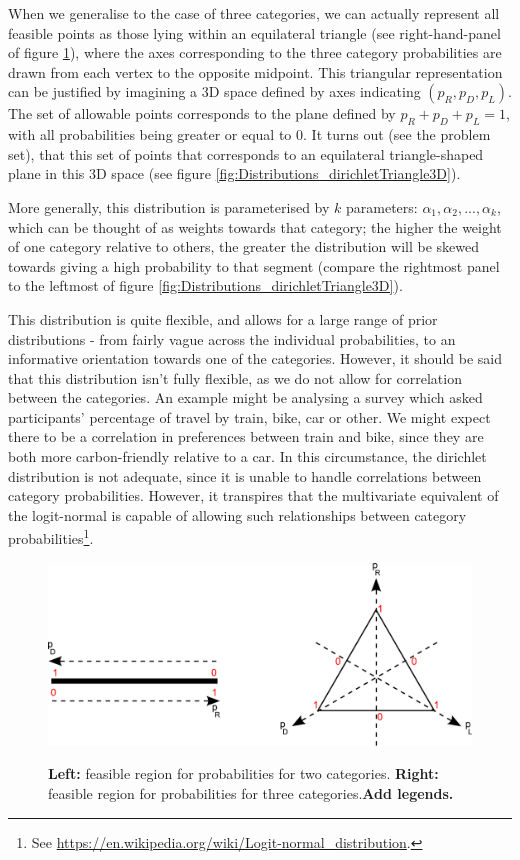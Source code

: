 \documentclass[11pt,fullpage]{book}
\begin{document}
When we generalise to the case of three categories, we can actually represent all feasible points as those lying within an equilateral triangle (see right-hand-panel of figure \ref{fig:Distributions_dirichlet}), where the axes corresponding to the three category probabilities are drawn from each vertex to the opposite midpoint. This triangular representation can be justified by imagining a 3D space defined by axes indicating $(p_R,p_D,p_L)$. The set of allowable points corresponds to the plane defined by $p_R+p_D+p_L=1$, with all probabilities being greater or equal to 0. It turns out (see the problem set), that this set of points that corresponds to an equilateral triangle-shaped plane in this 3D space (see figure \ref{fig:Distributions_dirichletTriangle3D}).

More generally, this distribution is parameterised by $k$ parameters: $\alpha_1,\alpha_2,...,\alpha_k$, which can be thought of as weights towards that category; the higher the weight of one category relative to others, the greater the distribution will be skewed towards giving a high probability to that segment (compare the rightmost panel to the leftmost of figure \ref{fig:Distributions_dirichletTriangle3D}).

This distribution is quite flexible, and allows for a large range of prior distributions - from fairly vague across the individual probabilities, to an informative orientation towards one of the categories. However, it should be said that this distribution isn't fully flexible, as we do not allow for correlation between the categories. An example might be analysing a survey which asked participants' percentage of travel by train, bike, car or other. We might expect there to be a correlation in preferences between train and bike, since they are both more carbon-friendly relative to a car. In this circumstance, the dirichlet distribution is not adequate, since it is unable to handle correlations between category probabilities. However, it transpires that the multivariate equivalent of the logit-normal is capable of allowing such relationships between category probabilities\footnote{See \url{https://en.wikipedia.org/wiki/Logit-normal\_distribution}.}.

\begin{figure}
\centering
\scalebox{0.5} 
{\includegraphics{Distributions_dirichlet.pdf}}
\caption{\textbf{Left:} feasible region for probabilities for two categories. \textbf{Right:} feasible region for probabilities for three categories.\textbf{Add legends.}}\label{fig:Distributions_dirichlet}
\end{figure}
\end{document}

